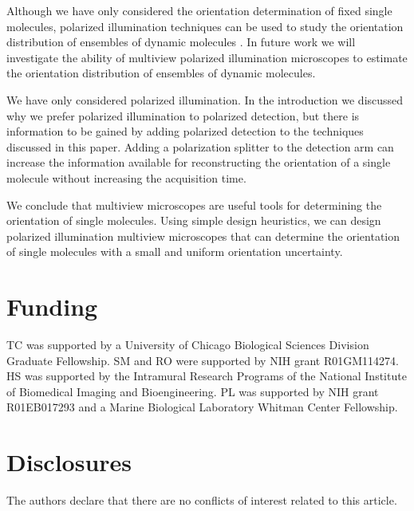 \documentclass[10pt]{article}
\begin{document}
Although we have only considered the orientation determination of fixed single
molecules, polarized illumination techniques can be used to study the
orientation distribution of ensembles of dynamic molecules \cite{mehta2016,
  backer2016}. In future work we will investigate the ability of multiview
polarized illumination microscopes to estimate the orientation distribution of
ensembles of dynamic molecules.

We have only considered polarized illumination. In the introduction
we discussed why we prefer polarized illumination to polarized detection, but
there is information to be gained by adding polarized detection to the
techniques discussed in this paper. Adding a polarization splitter to the
detection arm can increase the information available for reconstructing the
orientation of a single molecule without increasing the acquisition time.

We conclude that multiview microscopes are useful tools for determining the
orientation of single molecules. Using simple design heuristics, we can design
polarized illumination multiview microscopes that can determine the orientation
of single molecules with a small and uniform orientation uncertainty.

\section*{Funding}
TC was supported by a University of Chicago Biological Sciences Division
Graduate Fellowship. SM and RO were supported by NIH grant R01GM114274. HS was
supported by the Intramural Research Programs of the National Institute of
Biomedical Imaging and Bioengineering. PL was supported by NIH grant R01EB017293
and a Marine Biological Laboratory Whitman Center Fellowship.

\section*{Disclosures}
The authors declare that there are no conflicts of interest related to this article.
\end{document}

